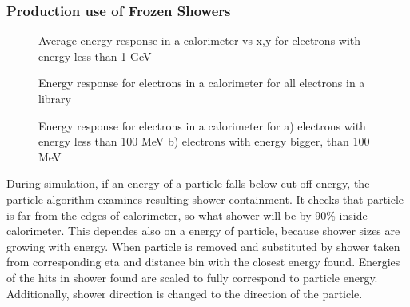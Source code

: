 \subsubsection{Production use of Frozen Showers}\label{sec:FSProd}

\begin{figure}[t]
\caption{Average energy response in a calorimeter vs x,y for electrons with energy less than 1 GeV }
\label{fig:FSFluctuations}
\end{figure}


\begin{figure}[t]
\caption{Energy response for electrons in a calorimeter for all electrons in a library}
\label{fig:FSProduction}
\end{figure}

\begin{figure}[t]
\begin{minipage}[h]{0.49\linewidth}
\end{minipage}
\hfill
\begin{minipage}[h]{0.49\linewidth}
\end{minipage}
\caption{Energy response for electrons in a calorimeter for  a) electrons with energy less than 100 MeV b) electrons with energy bigger, than 100 MeV}
\label{fig:FSProduction2}
\end{figure}


During simulation, if an energy of a particle falls below cut-off energy, the particle algorithm examines resulting shower containment. It checks  that particle is far from the edges of calorimeter, so what shower will be by 90\% inside calorimeter. This dependes also on a energy of particle, because shower sizes are growing with energy.
When particle is removed and substituted by shower taken from corresponding eta and distance bin with the closest energy found. Energies of the hits in shower found are scaled to fully correspond to particle energy. Additionally, shower direction is changed to the direction of the particle.

